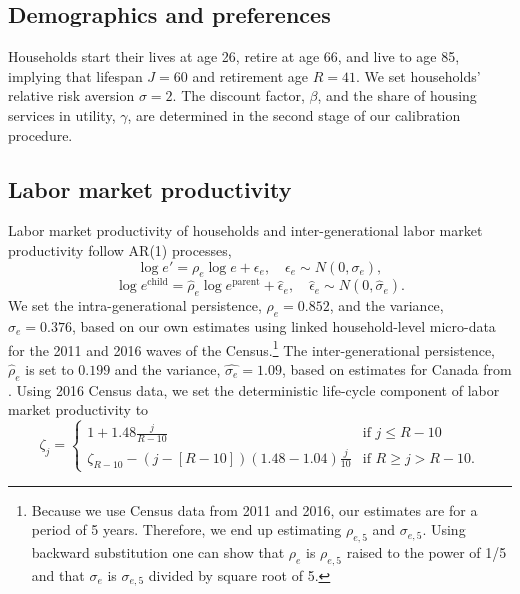 \documentclass[parskip=full]{article}
\begin{document}
\subsection{Demographics and preferences}
Households start their lives at age 26, retire at age 66, and live to age 85, implying that lifespan $J=60$ and retirement age $R=41$. We set households' relative risk aversion $\sigma=2$. The discount factor, $\beta$, and the share of housing services in utility, $\gamma$, are determined in the second stage of our calibration procedure.

\subsection{Labor market productivity}
Labor market productivity of households and inter-generational labor market productivity follow AR(1) processes,
\begin{equation*}
  \log e' = \rho_{e} \log e + \epsilon_{e},\quad \epsilon_{e}\sim N(0,\sigma_{e}),
\end{equation*}
\begin{equation*}
\log e^{\text{child}} = \hat{\rho}_{e} \log e^{\text{parent}} + \hat{\epsilon}_{e},\quad \hat{\epsilon}_{e}\sim N(0,\hat{\sigma}_{e}).
\end{equation*}
We set the intra-generational persistence, $\rho_{e}=0.852$, and the variance, $\sigma_{e}=0.376$, based on our own estimates using linked household-level micro-data for the 2011 and 2016 waves of the Census.\footnote{Because we use Census data from 2011 and 2016, our estimates are for a period of 5 years. Therefore, we end up estimating $\rho_{e,5}$ and $\sigma_{e,5}$. Using backward substitution one can show that $\rho_{e}$ is $\rho_{e,5}$ raised to the power of 1/5 and that $\sigma_{e}$ is $\sigma_{e,5}$ divided by square root of 5.} The inter-generational persistence, $\hat{\rho}_{e}$ is set to $0.199$ and the variance, $\hat{\sigma_{e}}=1.09$, based on estimates for Canada from \citet{corak-heisz-1999}. Using 2016 Census data, we set the deterministic life-cycle component of labor market productivity to 
\begin{equation*}
\zeta_j = \begin{cases}
1+1.48 \frac{j}{R-10} &\text{if $j\leq R-10$}\\
\zeta_{R-10}-\left(j-\left[R-10\right]\right) (1.48-1.04) \frac{j}{10} &\text{if $R \geq j>R-10$}.
\end{cases}
\end{equation*}
\end{document}
